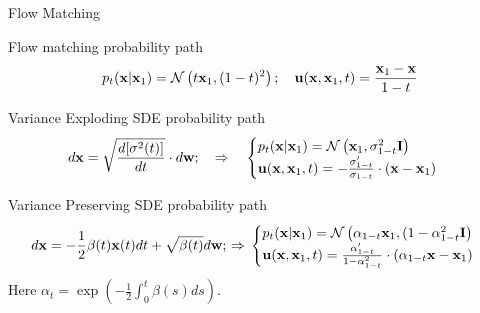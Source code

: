 \begin{frame}{Flow Matching}
	\begin{block}{Flow matching probability path}
		\vspace{-0.3cm}
		\[
			p_t(\mathbf{x} | \mathbf{x}_1) = \mathcal{N}\left(t \mathbf{x}_1, (1-t)^2\right); \quad \mathbf{u}(\mathbf{x}, \mathbf{x}_1, t) = \frac{\mathbf{x}_1  - \mathbf{x}}{1-t}
		\]
		\vspace{-0.3cm}
	\end{block}
	\begin{block}{Variance Exploding SDE probability path}
		\vspace{-0.3cm}
		\[
			d \mathbf{x} = \sqrt{\frac{ d [\sigma^2(t)]}{dt}} \cdot d \mathbf{w};
			\quad \Rightarrow \quad
			\begin{cases}
				p_t(\mathbf{x} | \mathbf{x}_1) = \mathcal{N}\left(\mathbf{x}_1, \sigma^2_{1-t}  \mathbf{I}\right) \\
				\mathbf{u}(\mathbf{x}, \mathbf{x}_1, t) = - \frac{\sigma'_{1-t}}{\sigma_{1-t}} \cdot (\mathbf{x} - \mathbf{x}_1)
			\end{cases}
		\]
		\vspace{-0.3cm}
	\end{block}
	\begin{block}{Variance Preserving SDE probability path}
		\vspace{-0.3cm}
		{\small
		\[
			d \mathbf{x} = - \frac{1}{2} \beta(t) \mathbf{x}(t) dt + \sqrt{\beta(t)} d \mathbf{w};
			\, \Rightarrow \,
			\begin{cases}
				p_t(\mathbf{x} | \mathbf{x}_1) = \mathcal{N}\left(\alpha_{1-t}  \mathbf{x}_1, (1 - \alpha^2_{1-t}  \mathbf{I} \right) \\
				\mathbf{u}(\mathbf{x}, \mathbf{x}_1, t) = \frac{\alpha'_{1-t}}{1 - \alpha^2_{1-t}}\cdot \left(\alpha_{1-t}  \mathbf{x} - \mathbf{x}_1\right)
			\end{cases}
		\]
		}
		Here $\alpha_t = \exp\left({-\frac{1}{2} \int_0^t \beta(s) ds} \right)$.
	\end{block}
\end{frame}
